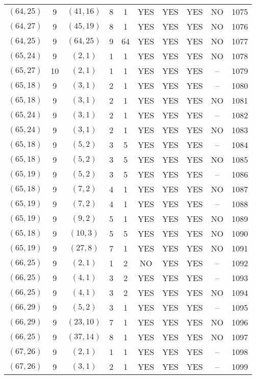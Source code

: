 \begin{longtable}{|c|c|c|c|c|c|c|c|c|c|}
$(64, 25)$ & 9 & $(41, 16)$ & 8 & 1 & YES & YES & YES & NO & 1075\\
$(64, 27)$ & 9 & $(45, 19)$ & 8 & 1 & YES & YES & YES & NO & 1076\\
$(64, 25)$ & 9 & $(64, 25)$ & 9 & 64 & YES & YES & YES & NO & 1077\\
$(65, 24)$ & 9 & $(2, 1)$ & 1 & 1 & YES & YES & YES & NO & 1078\\
$(65, 27)$ & 10 & $(2, 1)$ & 1 & 1 & YES & YES & YES & -- & 1079\\
$(65, 18)$ & 9 & $(3, 1)$ & 2 & 1 & YES & YES & YES & -- & 1080\\
$(65, 18)$ & 9 & $(3, 1)$ & 2 & 1 & YES & YES & YES & NO & 1081\\
$(65, 24)$ & 9 & $(3, 1)$ & 2 & 1 & YES & YES & YES & -- & 1082\\
$(65, 24)$ & 9 & $(3, 1)$ & 2 & 1 & YES & YES & YES & NO & 1083\\
$(65, 18)$ & 9 & $(5, 2)$ & 3 & 5 & YES & YES & YES & -- & 1084\\
$(65, 18)$ & 9 & $(5, 2)$ & 3 & 5 & YES & YES & YES & NO & 1085\\
$(65, 19)$ & 9 & $(5, 2)$ & 3 & 5 & YES & YES & YES & -- & 1086\\
$(65, 18)$ & 9 & $(7, 2)$ & 4 & 1 & YES & YES & YES & NO & 1087\\
$(65, 19)$ & 9 & $(7, 2)$ & 4 & 1 & YES & YES & YES & -- & 1088\\
$(65, 19)$ & 9 & $(9, 2)$ & 5 & 1 & YES & YES & YES & NO & 1089\\
$(65, 18)$ & 9 & $(10, 3)$ & 5 & 5 & YES & YES & YES & NO & 1090\\
$(65, 19)$ & 9 & $(27, 8)$ & 7 & 1 & YES & YES & YES & NO & 1091\\
$(66, 25)$ & 9 & $(2, 1)$ & 1 & 2 & NO & YES & YES & -- & 1092\\
$(66, 25)$ & 9 & $(4, 1)$ & 3 & 2 & YES & YES & YES & -- & 1093\\
$(66, 25)$ & 9 & $(4, 1)$ & 3 & 2 & YES & YES & YES & NO & 1094\\
$(66, 29)$ & 9 & $(5, 2)$ & 3 & 1 & YES & YES & YES & -- & 1095\\
$(66, 29)$ & 9 & $(23, 10)$ & 7 & 1 & YES & YES & YES & NO & 1096\\
$(66, 25)$ & 9 & $(37, 14)$ & 8 & 1 & YES & YES & YES & NO & 1097\\
$(67, 26)$ & 9 & $(2, 1)$ & 1 & 1 & YES & YES & YES & -- & 1098\\
$(67, 26)$ & 9 & $(3, 1)$ & 2 & 1 & YES & YES & YES & -- & 1099\\

\end{longtable}

